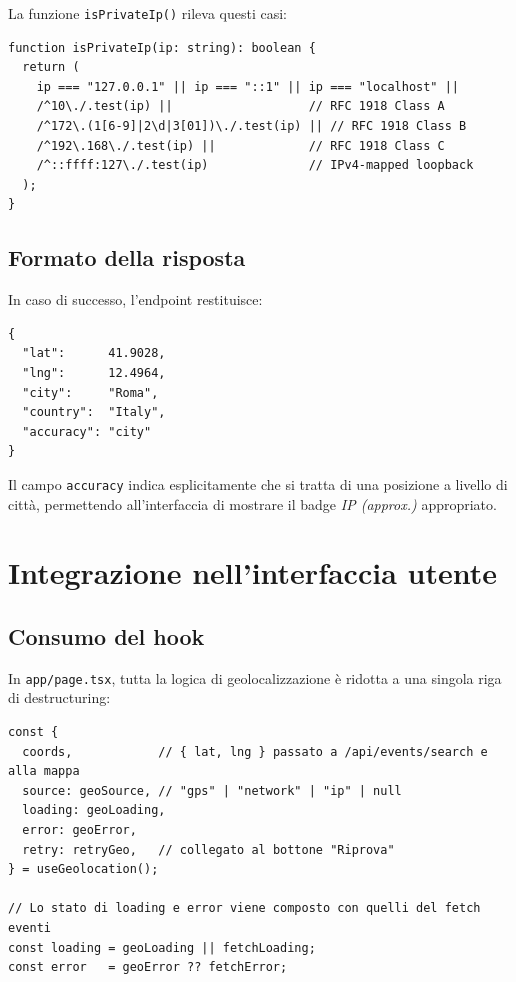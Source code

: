 \documentclass[12pt, a4paper]{article}
\begin{document}
La funzione \texttt{isPrivateIp()} rileva questi casi:

\begin{lstlisting}[caption={Rilevamento di indirizzi IP privati}]
function isPrivateIp(ip: string): boolean {
  return (
    ip === "127.0.0.1" || ip === "::1" || ip === "localhost" ||
    /^10\./.test(ip) ||                   // RFC 1918 Class A
    /^172\.(1[6-9]|2\d|3[01])\./.test(ip) || // RFC 1918 Class B
    /^192\.168\./.test(ip) ||             // RFC 1918 Class C
    /^::ffff:127\./.test(ip)              // IPv4-mapped loopback
  );
}
\end{lstlisting}

\subsection{Formato della risposta}

In caso di successo, l'endpoint restituisce:

\begin{lstlisting}[language={},caption={Risposta JSON di \texttt{GET /api/geo}}]
{
  "lat":      41.9028,
  "lng":      12.4964,
  "city":     "Roma",
  "country":  "Italy",
  "accuracy": "city"
}
\end{lstlisting}

Il campo \texttt{accuracy} indica esplicitamente che si tratta di una
posizione a livello di città, permettendo all'interfaccia di mostrare il
badge \textit{IP (approx.)} appropriato.

\section{Integrazione nell'interfaccia utente}

\subsection{Consumo del hook}

In \texttt{app/page.tsx}, tutta la logica di geolocalizzazione è ridotta a
una singola riga di destructuring:

\begin{lstlisting}[caption={Consumo del hook nella pagina principale}]
const {
  coords,            // { lat, lng } passato a /api/events/search e alla mappa
  source: geoSource, // "gps" | "network" | "ip" | null
  loading: geoLoading,
  error: geoError,
  retry: retryGeo,   // collegato al bottone "Riprova"
} = useGeolocation();

// Lo stato di loading e error viene composto con quelli del fetch eventi
const loading = geoLoading || fetchLoading;
const error   = geoError ?? fetchError;
\end{lstlisting}
\end{document}
